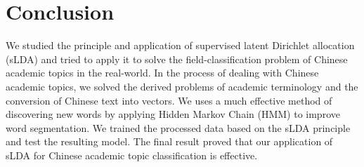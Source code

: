 \documentclass{acmtog} %
\begin{document}
\section{Conclusion}
\label{sec:conclusion}
%
We studied the principle and application of supervised latent Dirichlet allocation (sLDA) and tried to apply it to solve the field-classification problem of Chinese academic topics in the real-world. In the process of dealing with Chinese academic topics, we solved the derived problems of academic terminology and the conversion of Chinese text into vectors. We uses a much effective method of discovering new words by applying Hidden Markov Chain (HMM) to improve word segmentation. We trained the processed data based on the sLDA principle and test the resulting model. The final result proved that our application of sLDA for Chinese academic topic classification is effective.

\cite{mcauliffe2008supervised}
\cite{bodrunova2013interval}
\cite{bickel2015mathematical}
\cite{blei2009topic}
\cite{yu2010hidden}
\cite{morwal2012named}





\end{document}

